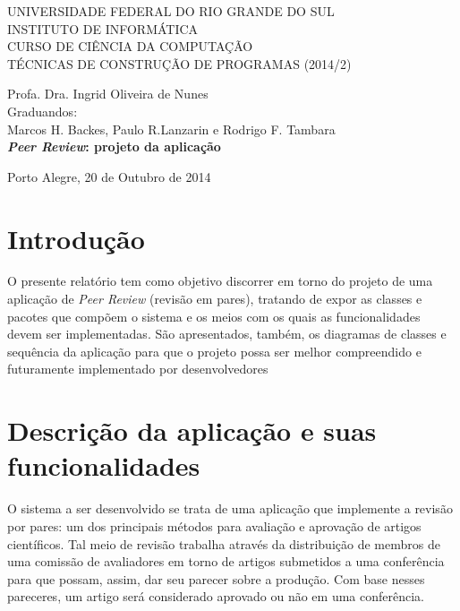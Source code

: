 \documentclass[a4paper, 12pt]{article}
\begin{document}
\begin{titlepage}
\begin{center}


\large{ 
\uppercase{ Universidade Federal do Rio Grande do Sul\\

Instituto de Informática \\

Curso de Ciência da Computação \\

TÉCNICAS DE CONSTRUÇÃO DE PROGRAMAS (2014/2)\\
}

Profa. Dra. Ingrid Oliveira de Nunes\\


Graduandos: \\ Marcos H. Backes, Paulo R.Lanzarin e 
	 Rodrigo F. Tambara \\[5.5cm]



\LARGE {\bfseries \emph{Peer Review}: projeto da aplicação  \\[1.0cm] %
}}


\vfill

Porto Alegre, 20 de Outubro de 2014

\end{center}
\end{titlepage}

\section{Introdução}
O presente relatório tem como objetivo discorrer em torno do projeto de uma aplicação de \emph{Peer Review} (revisão em pares), tratando de expor as classes e pacotes que compõem o sistema e os meios com os quais as funcionalidades devem ser implementadas. São apresentados, também, os diagramas de classes e sequência da aplicação para que o projeto possa ser melhor compreendido e futuramente implementado por desenvolvedores

\section{Descrição da aplicação e suas funcionalidades}

O sistema a ser desenvolvido se trata de uma aplicação que implemente a revisão por pares: um dos principais métodos para avaliação e aprovação de artigos científicos. Tal meio de revisão trabalha através da distribuição de membros de uma comissão de avaliadores em torno de artigos submetidos a uma conferência para que possam, assim, dar seu parecer sobre a produção. Com base nesses pareceres, um artigo será considerado aprovado ou não em uma conferência.
\end{document}
